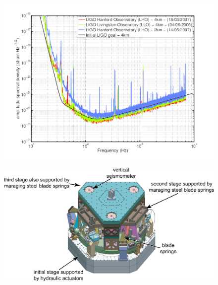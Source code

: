 \begin{figure}[]
\begin{center}
\includegraphics[width=1\columnwidth]{./figures/LIGOsens/LIGOsens}
\caption{ \protect}
\end{center}
\end{figure}



\begin{figure}[]
\begin{center}
\includegraphics[width=1\columnwidth]{./figures/fig3/fig3}
\caption{ \protect}
\end{center}
\end{figure}


